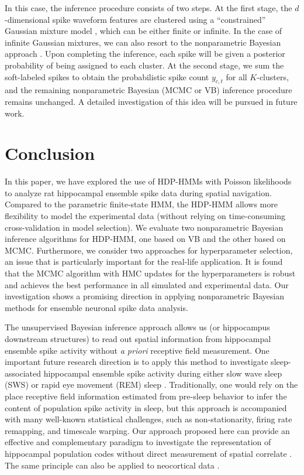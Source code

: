 In this case, the inference procedure consists of two steps. At the first stage, the $d$-dimensional spike waveform features are clustered 
using a ``constrained'' Gaussian mixture model \citep{Zou12}, which can be either finite or infinite. In the case of infinite Gaussian mixtures, we can also resort to the nonparametric Bayesian approach \citep{Rasmussen99,Gorur10,Wood08}. Upon completing the inference, each spike will be given a posterior probability of being assigned to each cluster. 
At the second stage, we sum the soft-labeled spikes  to obtain the probabilistic spike count $y_{c,t}$ for all $K$-clusters, and the  remaining 
nonparametric Bayesian (MCMC or VB) inference  procedure remains unchanged. A detailed investigation of this idea will be pursued in future work. 




\section{Conclusion}

In this paper, we have explored the use of HDP-HMMs with Poisson likelihoods to analyze rat hippocampal ensemble spike data during spatial navigation. Compared to 
the parametric finite-state HMM, the HDP-HMM allows more flexibility to model the experimental data (without relying on time-consuming cross-validation in model selection). We evaluate two nonparametric Bayesian inference algorithms for HDP-HMM,  one based on VB and the other based on MCMC. Furthermore, we consider two approaches for hyperparameter selection, an issue that is particularly important for the real-life application.  It is found that the MCMC algorithm with HMC updates for the hyperparameters is  robust and achieves the best performance in all simulated and experimental data. Our investigation shows a promising direction in applying nonparametric Bayesian methods for ensemble neuronal spike data analysis.  

The unsupervised Bayesian inference approach  allows us (or hippocampus downstream structures) to read out spatial information from hippocampal ensemble spike activity without {\em a priori} receptive field measurement.
One important future research direction is to apply this method to investigate sleep-associated hippocampal ensemble spike activity  during either slow wave sleep (SWS) or rapid eye movement (REM) sleep \citep{Louie01,Lee02}. Traditionally, one would rely on the place receptive field information estimated from pre-sleep behavior to infer the content of population spike activity in  sleep, but this approach is accompanied with many well-known statistical challenges, such as non-stationarity, firing rate remapping, and timescale warping. Our approach proposed here can provide an effective and complementary paradigm to investigate the representation of hippocampal population codes without direct measurement of spatial correlate \citep{Chen15}. The same principle can also be applied to neocortical data \citep{Ji07,Peyrache09,Gulati14}.  


